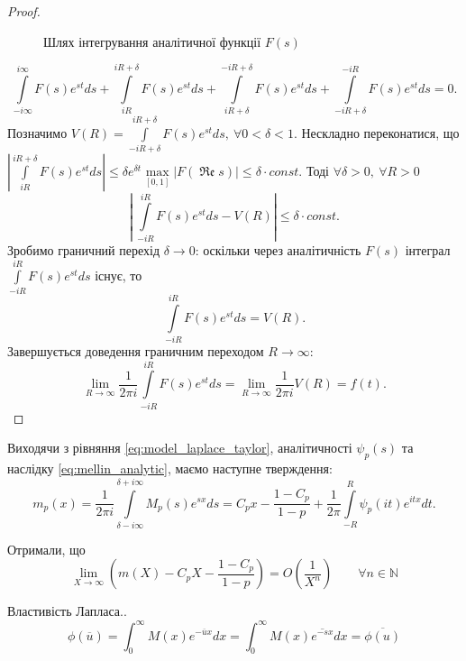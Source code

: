 \begin{corollary}
\begin{proof}
\begin{figure}[h]
	\caption{Шлях інтегрування аналітичної функції $F(s)$}
\end{figure}
\begin{equation*}
\int\limits_{-i\infty}^{i\infty} F(s) e^{st} ds + \int\limits_{iR}^{iR + \delta} F(s) e^{st} ds + \int\limits_{iR + \delta}^{-iR + \delta} F(s) e^{st} ds + \int\limits_{-iR + \delta}^{-iR} F(s) e^{st} ds = 0.
\end{equation*}
Позначимо $V(R)=\int\limits_{-iR + \delta}^{iR + \delta} F(s) e^{st} ds, ~\forall 0 < \delta < 1$. Нескладно переконатися, що 
$|\int\limits_{iR}^{iR + \delta} F(s) e^{st} ds| \leq \delta e^{\delta t} \max\limits_{[0,1]} |F(\operatorname{\mathfrak{Re}} s)| \leq \delta \cdot const$. Тоді $\forall \delta > 0, ~\forall R > 0$
\begin{equation*}
\left|~\int\limits_{-iR}^{iR} F(s) e^{st} ds - V(R)\right| \leq \delta \cdot const.
\end{equation*}
Зробимо граничний перехід $\delta \rightarrow 0$: оскільки через аналітичність $F(s)$ інтеграл $\int\limits_{-iR}^{iR} F(s) e^{st} ds$ існує, то
\begin{equation*}
\int\limits_{-iR}^{iR} F(s) e^{st} ds = V(R).
\end{equation*}
Завершується доведення граничним переходом $R \rightarrow \infty$:
\begin{equation*}
\lim\limits_{R \rightarrow \infty} \frac{1}{2\pi i} \int\limits_{-iR}^{iR} F(s) e^{st} ds =\lim\limits_{R \rightarrow \infty}\frac{1}{2\pi i} V(R) = f(t).
\end{equation*}
\end{proof}
\end{corollary}

Виходячи з рівняння \eqref{eq:model_laplace_taylor}, аналітичності $\psi_{p} (s)$ та наслідку \eqref{eq:mellin_analytic}, маємо наступне тверждення:
\begin{equation}
m_{p}(x) = \frac{1}{2\pi i} \int\limits_{\delta - i\infty}^{\delta + i\infty} M_{p}(s) e^{sx} ds = C_{p} x - \frac{1 - C_p}{1-p} + \frac{1}{2\pi} \int\limits_{-R}^{R} \psi_{p}(it) e^{itx} dt.
\end{equation}

Отримали, що
\begin{equation}
\label{eq:uniform_right_as_enhanced}
\lim\limits_{X \rightarrow \infty} \left( m(X) - C_{p} X - \frac{1 - C_{p}}{1 - p} \right) = O\left(\frac{1}{X^{n}}\right) \qquad \forall n \in \mathbb{N}
\end{equation}

Властивість Лапласа..
\begin{equation}
\phi(\overline{u}) = \int_0^\infty M(x) e^{-\overline{u}x} dx = \int_0^\infty M(x) \overline{e^{-sx}} dx = \overline{\phi(u)}
\end{equation}